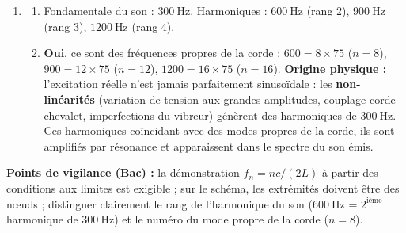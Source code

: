 \documentclass[11pt]{article}
\begin{document}
\begin{corrige}
\begin{enumerate}
\begin{enumerate}
    \end{enumerate}
    \item \begin{enumerate}
        \item Fondamentale du son : $300\ \text{Hz}$. Harmoniques : $600\ \text{Hz}$ (rang 2), $900\ \text{Hz}$ (rang 3), $1200\ \text{Hz}$ (rang 4).
        \item \textbf{Oui}, ce sont des fréquences propres de la corde : $600 = 8 \times 75$ ($n=8$), $900 = 12 \times 75$ ($n=12$), $1200 = 16 \times 75$ ($n=16$).
        \textbf{Origine physique :} l'excitation réelle n'est jamais parfaitement sinusoïdale : les \textbf{non-linéarités} (variation de tension aux grandes amplitudes, couplage corde-chevalet, imperfections du vibreur) génèrent des harmoniques de $300\ \text{Hz}$. Ces harmoniques coïncidant avec des modes propres de la corde, ils sont amplifiés par résonance et apparaissent dans le spectre du son émis.
    \end{enumerate}
\end{enumerate}
\textbf{Points de vigilance (Bac) :} la démonstration $f_n = n c/(2L)$ à partir des conditions aux limites est exigible ; sur le schéma, les extrémités doivent être des nœuds ; distinguer clairement le rang de l'harmonique du son ($600\ \text{Hz}$ = $2^{\text{ième}}$ harmonique de $300\ \text{Hz}$) et le numéro du mode propre de la corde ($n = 8$).
\end{corrige}
\end{document}
